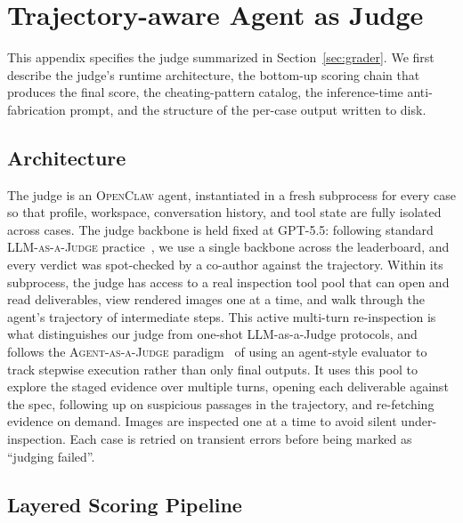 \FloatBarrier
\section{Trajectory-aware Agent as Judge}
\label{app:grader}

This appendix specifies the judge summarized in Section~\ref{sec:grader}. We first describe the judge's runtime architecture, the bottom-up scoring chain that produces the final score, the cheating-pattern catalog, the inference-time anti-fabrication prompt, and the structure of the per-case output written to disk.

\subsection{Architecture}
\label{app:arch}

The judge is an \textsc{OpenClaw} agent, instantiated in a fresh subprocess for every case so that profile, workspace, conversation history, and tool state are fully isolated across cases. The judge backbone is held fixed at GPT-5.5: following standard \textsc{LLM-as-a-Judge} practice~\citep{zheng2023llmjudge,liu2023geval}, we use a single backbone across the leaderboard, and every verdict was spot-checked by a co-author against the trajectory. Within its subprocess, the judge has access to a real inspection tool pool that can open and read deliverables, view rendered images one at a time, and walk through the agent's trajectory of intermediate steps. This active multi-turn re-inspection is what distinguishes our judge from one-shot LLM-as-a-Judge protocols, and follows the \textsc{Agent-as-a-Judge} paradigm~\citep{zhuge2024agentasjudge} of using an agent-style evaluator to track stepwise execution rather than only final outputs. It uses this pool to explore the staged evidence over multiple turns, opening each deliverable against the spec, following up on suspicious passages in the trajectory, and re-fetching evidence on demand. Images are inspected one at a time to avoid silent under-inspection. Each case is retried on transient errors before being marked as ``judging failed''.

\subsection{Layered Scoring Pipeline}
\label{app:axes}

